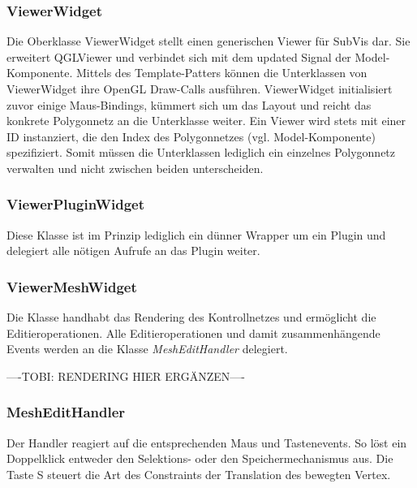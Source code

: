 \subsubsection{ViewerWidget}

Die Oberklasse ViewerWidget stellt einen generischen Viewer für SubVis dar.
Sie erweitert QGLViewer und verbindet sich mit dem updated Signal der Model-Komponente.
Mittels des Template-Patters können die Unterklassen von ViewerWidget ihre OpenGL Draw-Calls ausführen.
ViewerWidget initialisiert zuvor einige Maus-Bindings, kümmert sich um das Layout und reicht das konkrete Polygonnetz an die Unterklasse weiter.
Ein Viewer wird stets mit einer ID instanziert, die den Index des Polygonnetzes (vgl. Model-Komponente) spezifiziert.
Somit müssen die Unterklassen lediglich ein einzelnes Polygonnetz verwalten und nicht zwischen beiden unterscheiden.

\subsubsection{ViewerPluginWidget}

Diese Klasse ist im Prinzip lediglich ein dünner Wrapper um ein Plugin und delegiert alle nötigen Aufrufe an das Plugin weiter.

\subsubsection{ViewerMeshWidget}

Die Klasse handhabt das Rendering des Kontrollnetzes und ermöglicht die Editieroperationen.
Alle Editieroperationen und damit zusammenhängende Events werden an die Klasse \emph{MeshEditHandler} delegiert.


----TOBI: RENDERING HIER ERGÄNZEN----


\subsubsection{MeshEditHandler}

Der Handler reagiert auf die entsprechenden Maus und Tastenevents.
So löst ein Doppelklick entweder den Selektions- oder den Speichermechanismus aus.
Die Taste S steuert die Art des Constraints der Translation des bewegten Vertex.

